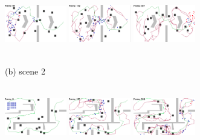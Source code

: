 \documentclass[letterpaper, 10pt, conference]{ieeeconf}
\begin{document}
\begin{figure}
\includegraphics[width=0.24\textwidth,height=1.35in,frame]{figs/hurdles_2.png}
\includegraphics[width=0.24\textwidth,height=1.35in,frame]{figs/hurdles_3.png}
\includegraphics[width=0.24\textwidth,height=1.35in,frame]{figs/hurdles_4.png}\\[2mm]
(b) scene 2\\[2mm]
\includegraphics[width=0.24\textwidth,height=1.35in,frame]{figs/maze2_1.png}
\includegraphics[width=0.24\textwidth,height=1.35in,frame]{figs/maze2_2.png}
\includegraphics[width=0.24\textwidth,height=1.35in,frame]{figs/maze2_3.png}

\end{figure}
\end{document}
